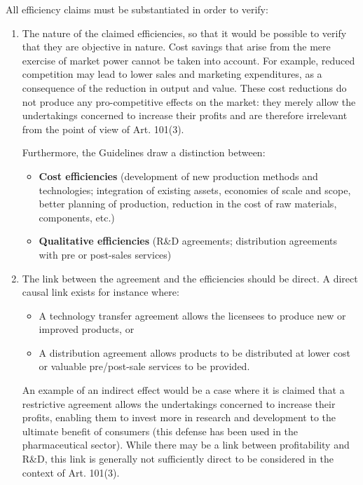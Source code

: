         All efficiency claims must be substantiated in order to verify:

        \begin{enumerate}[label=\alph*.]
            \item The nature of the claimed efficiencies, so that it would be possible to verify that they are objective in nature. Cost savings that arise from the mere exercise of market power cannot be taken into account. For example, reduced competition may lead to lower sales and marketing expenditures, as a consequence of the reduction in output and value. These cost reductions do not produce any pro-competitive effects on the market: they merely allow the undertakings concerned to increase their profits and are therefore irrelevant from the point of view of Art. 101(3).

            Furthermore, the Guidelines draw a distinction between:
            \begin{itemize}
                \item \textbf{Cost efficiencies} (development of new production methods and technologies; integration of existing assets, economies of scale and scope, better planning of production, reduction in the cost of raw materials, components, etc.)
                \item \textbf{Qualitative efficiencies} (R\&D agreements; distribution agreements with pre or post-sales services)
            \end{itemize}
            
            \item  The link between the agreement and the efficiencies should be direct. A direct causal link exists for instance where:
                \begin{itemize}
                    \item A technology transfer agreement allows the licensees to produce new or improved products, or
                    \item A distribution agreement allows products to be distributed at lower cost or valuable pre/post-sale services to be provided.
                \end{itemize}
            
            An example of an indirect effect would be a case where it is claimed that a restrictive agreement allows the undertakings concerned to increase their profits, enabling them to invest more in research and development to the ultimate benefit of consumers (this defense has been used in the pharmaceutical sector). While there may be a link between profitability and R\&D, this link is generally not sufficiently direct to be considered in the context of Art. 101(3).
            

\end{enumerate}
